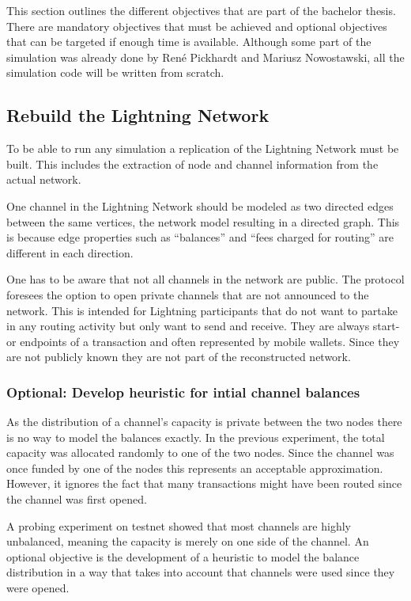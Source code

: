 \documentclass[final]{fhnwreport}       %
\begin{document}
This section outlines the different objectives that are part of the bachelor thesis. There are mandatory objectives that must be achieved and optional objectives that can be targeted if enough time is available. Although some part of the simulation was already done by René Pickhardt and Mariusz Nowostawski, all the simulation code will be written from scratch.

\subsection{Rebuild the Lightning Network}\label{sec:o_rebuild}

To be able to run any simulation a replication of the Lightning Network must be built. This includes the extraction of node and channel information from the actual network.

One channel in the Lightning Network should be modeled as two directed edges between the same vertices, the network model resulting in a directed graph. This is because edge properties such as ``balances'' and ``fees charged for routing'' are different in each direction. 

One has to be aware that not all channels in the network are public. The protocol foresees the option to open private channels that are not announced to the network. This is intended for Lightning participants that do not want to partake in any routing activity but only want to send and receive. They are always start- or endpoints of a transaction and often represented by mobile wallets. Since they are not publicly known they are not part of the reconstructed network. 

\subsubsection{Optional: Develop heuristic for intial channel balances}

As the distribution of a channel's capacity is private between the two nodes there is no way to model the balances exactly. In the previous experiment, the total capacity was allocated randomly to one of the two nodes. Since the channel was once funded by one of the nodes this represents an acceptable approximation. However, it ignores the fact that many transactions might have been routed since the channel was first opened. 

A probing experiment on testnet \cite{tikhomirov_probing_2020} showed that most channels are highly unbalanced, meaning the capacity is merely on one side of the channel. An optional objective is the development of a heuristic to model the balance distribution in a way that takes into account that channels were used since they were opened.
\end{document}
